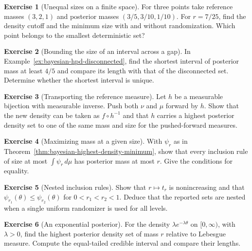 \documentclass[11pt,oneside]{book}
\theoremstyle{definition}
\newtheorem{exercise}{Exercise}[section]
\theoremstyle{remark}
\begin{document}
\begin{exercise}[Unequal sizes on a finite space]
\label{exer:bayesian-hpd-finite-weighted}
For three points take reference masses $(3,2,1)$ and posterior
masses $(3/5,3/10,1/10)$. For $r=7/25$, find the density
cutoff and the minimum size with and without randomization.
Which point belongs to the smallest deterministic set?
\end{exercise}

\begin{exercise}[Bounding the size of an interval across a gap]
\label{exer:bayesian-hpd-gap}
In Example~\ref{ex:bayesian-hpd-disconnected}, find the shortest
interval of posterior mass at least $4/5$ and compare its
length with that of the disconnected set. Determine whether
the shortest interval is unique.
\end{exercise}

\begin{exercise}[Transporting the reference measure]
\label{exer:bayesian-hpd-transport-reference}
Let $h$ be a measurable bijection with measurable inverse.
Push both $\nu$ and $\mu$ forward by $h$. Show that the new
density can be taken as $f\circ h^{-1}$ and that $h$ carries
a highest posterior density set to one of the same mass and
size for the pushed-forward measures.
\end{exercise}

\begin{exercise}[Maximizing mass at a given size]
\label{exer:bayesian-hpd-fixed-size}
With $\psi_r$ as in Theorem~\ref{thm:bayesian-highest-density-minimum},
show that every inclusion rule of size at most $\int\psi_r\,d\mu$
has posterior mass at most $r$. Give the conditions for equality.
\end{exercise}

\begin{exercise}[Nested inclusion rules]
\label{exer:bayesian-hpd-nesting}
Show that $r\mapsto t_r$ is nonincreasing and that
$\psi_{r_1}(\theta)\leq\psi_{r_2}(\theta)$ for $0<r_1<r_2<1$.
Deduce that the reported sets are nested when a single
uniform randomizer is used for all levels.
\end{exercise}

\begin{exercise}[An exponential posterior]
\label{exer:bayesian-hpd-exponential}
For the density $\lambda e^{-\lambda\theta}$ on $[0,\infty)$,
with $\lambda>0$, find the highest posterior density set of
mass $r$ relative to Lebesgue measure. Compute the equal-tailed
credible interval and compare their lengths.
\end{exercise}
\end{document}
